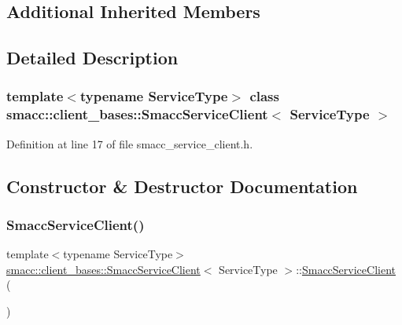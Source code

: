 \subsection*{Additional Inherited Members}


\subsection{Detailed Description}
\subsubsection*{template$<$typename Service\+Type$>$\newline
class smacc\+::client\+\_\+bases\+::\+Smacc\+Service\+Client$<$ Service\+Type $>$}



Definition at line 17 of file smacc\+\_\+service\+\_\+client.\+h.



\subsection{Constructor \& Destructor Documentation}
\mbox{\label{classsmacc_1_1client__bases_1_1SmaccServiceClient_ab041a903fa40cb5df251f0cd437604cc}} 
\subsubsection{\texorpdfstring{Smacc\+Service\+Client()}{SmaccServiceClient()}}
{\footnotesize\ttfamily template$<$typename Service\+Type$>$ \\
\hyperlink{classsmacc_1_1client__bases_1_1SmaccServiceClient}{smacc\+::client\+\_\+bases\+::\+Smacc\+Service\+Client}$<$ Service\+Type $>$\+::\hyperlink{classsmacc_1_1client__bases_1_1SmaccServiceClient}{Smacc\+Service\+Client} (\begin{DoxyParamCaption}{ }\end{DoxyParamCaption})\hspace{0.3cm}{\ttfamily [inline]}}



